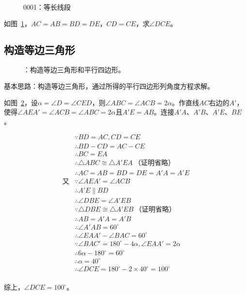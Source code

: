 

\begin{figure}[htbp]
  \centering
  \caption{0001：等长线段} \label{fig:0001}
\end{figure}

如图~\ref{fig:0001}，$AC = AB = BD = DE$，$CD = CE$，求$\angle DCE$。


\subsection{构造等边三角形} \label{subsec:0001-eqtri}

\begin{figure}[htbp]
  \centering
  \caption{：构造等边三角形和平行四边形。} \label{fig:0001-eqtri}
\end{figure}

基本思路：构造等边三角形，通过所得的平行四边形列角度方程求解。

如图~\ref{fig:0001-eqtri}，设$\alpha = \angle D = \angle CED$，则$\angle ABC = \angle ACB = 2\alpha$。作直线$AC$右边的$A'$，使得$\angle AEA' = \angle ACB = \angle ABC = 2\alpha$且$A'E = AB$。连接$A'A$、$A'B$、$A'E$、$BE$。

\begin{align*}
  &\because   BD = AC, CD = CE \\
  &\therefore BD - CD = AC - CE \\
  &\therefore BC = EA \\
  &\therefore \triangle ABC \cong \triangle A'EA \ \text{（证明省略）} \\
  &\therefore AC = AB = BD = DE = A'A = A'E \\
  \text{又}&\because \angle AEA' = \angle ACB \\
  &\therefore A'E \parallel BD \\
  &\therefore \angle DBE = \angle A'EB \\
  &\because   \triangle DBE \cong \triangle A'EB \ \text{（证明省略）} \\
  &\therefore AB = A'A = A'B \\
  &\therefore \angle A'AB = 60^\circ \\
  &\therefore \angle EAA' - \angle BAC = 60^\circ \\
  &\because   \angle BAC' = 180^\circ - 4\alpha, \angle EAA' = 2\alpha \\
  &\therefore 6\alpha - 180^\circ = 60^\circ \\
  &\therefore \alpha = 40^\circ \\
  &\therefore \angle DCE = 180^\circ - 2\times40^\circ = 100^\circ \\
\end{align*}

综上，$\angle DCE = 100^\circ$。
